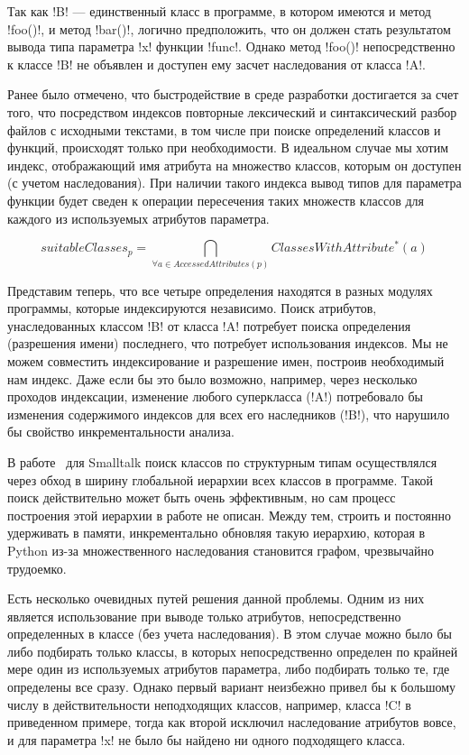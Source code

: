 Так как !B! --- единственный класс в программе, в котором имеются и метод
!foo()!, и метод !bar()!, логично предположить, что он должен стать
результатом вывода типа параметра !x!  функции !func!. Однако метод !foo()!
непосредственно к классе !B!  не объявлен и доступен ему засчет
наследования от класса !A!. 

Ранее было отмечено, что быстродействие в среде
разработки достигается за счет того, что посредством индексов повторные
лексический и синтаксический разбор файлов с исходными текстами, в том числе при
поиске определений классов и функций, происходят только при необходимости. 
В идеальном случае мы хотим индекс, отображающий имя атрибута на множество
классов, которым он доступен (с учетом наследования). При наличии такого индекса
вывод типов для параметра функции будет сведен к операции пересечения таких множеств
классов для каждого из используемых атрибутов параметра.

\[
  suitableClasses_p = \bigcap_{\forall{a} \in AccessedAttributes(p)}
  ClassesWithAttribute^*(a)
\]

Представим теперь, что все четыре определения находятся в разных модулях
программы, которые индексируются независимо. Поиск атрибутов, унаследованных
классом !B! от класса !A! потребует поиска определения (разрешения имени) последнего, 
что потребует использования индексов. Мы не можем совместить
индексирование и разрешение имен, построив необходимый нам индекс. Даже если бы
это было возможно, например, через несколько проходов
индексации, изменение любого суперкласса (!A!) потребовало бы изменения
содержимого индексов для всех его наследников (!B!), что
нарушило бы свойство инкрементальности анализа.

В работе~\cite{Pluquet2009} для Smalltalk поиск классов по структурным типам осуществлялся
через обход в ширину глобальной иерархии всех классов в программе. Такой поиск
действительно может быть очень эффективным, но сам процесс построения этой
иерархии в работе не описан. Между тем, строить и постоянно удерживать в памяти,
инкрементально обновляя такую иерархию, которая в Python из-за множественного
наследования становится графом, чрезвычайно трудоемко.

Есть несколько очевидных путей решения данной проблемы. Одним из них является
использование при выводе только атрибутов, непосредственно определенных в классе
(без учета наследования). В этом случае можно было бы либо подбирать только
классы, в которых непосредственно определен по крайней мере один из используемых
атрибутов параметра, либо подбирать только те, где определены все сразу. Однако
первый вариант неизбежно привел бы к большому числу в действительности
неподходящих классов, например, класса !C! в приведенном примере, тогда как второй
исключил наследование атрибутов вовсе, и для параметра !x! не было бы
найдено ни одного подходящего класса.

